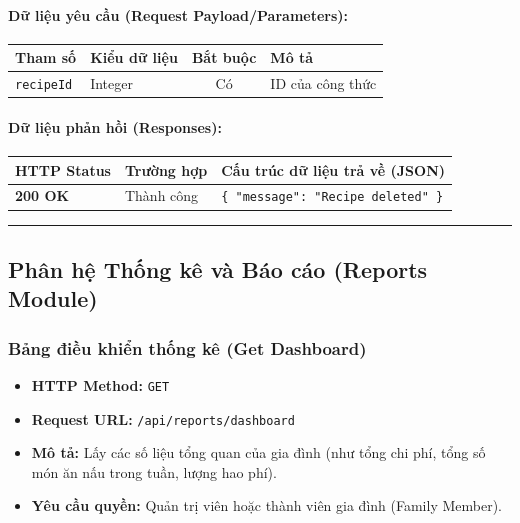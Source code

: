 \documentclass[12pt,a4paper]{article}
\begin{document}
\paragraph{Dữ liệu yêu cầu (Request Payload/Parameters):}
\begin{longtable}{|>{\raggedright\arraybackslash}p{2.8cm}|>{\raggedright\arraybackslash}p{2.2cm}|c|>{\raggedright\arraybackslash}p{7.0cm}|}
\hline
\textbf{Tham số} & \textbf{Kiểu dữ liệu} & \textbf{Bắt buộc} & \textbf{Mô tả} \\ \hline
\endhead
\texttt{recipeId} & Integer & Có & ID của công thức \\ \hline
\end{longtable}

\paragraph{Dữ liệu phản hồi (Responses):}
\begin{longtable}{|>{\raggedright\arraybackslash}p{2.8cm}|>{\raggedright\arraybackslash}p{3.2cm}|>{\raggedright\arraybackslash}p{8.0cm}|}
\hline
\textbf{HTTP Status} & \textbf{Trường hợp} & \textbf{Cấu trúc dữ liệu trả về (JSON)} \\ \hline
\endhead
\textbf{200 OK} & Thành công & \texttt{\{ "message": "Recipe deleted" \}} \\ \hline
\end{longtable}

\vskip 0.4cm
\noindent\rule{\textwidth}{0.3pt}
\vskip 0.4cm

\subsection{Phân hệ Thống kê và Báo cáo (Reports Module)}

\subsubsection{Bảng điều khiển thống kê (Get Dashboard)}
\begin{itemize}[leftmargin=*]
    \item \textbf{HTTP Method:} \texttt{GET}
    \item \textbf{Request URL:} \texttt{/api/reports/dashboard}
    \item \textbf{Mô tả:} Lấy các số liệu tổng quan của gia đình (như tổng chi phí, tổng số món ăn nấu trong tuần, lượng hao phí).
    \item \textbf{Yêu cầu quyền:} Quản trị viên hoặc thành viên gia đình (Family Member).
\end{itemize}
\end{document}
